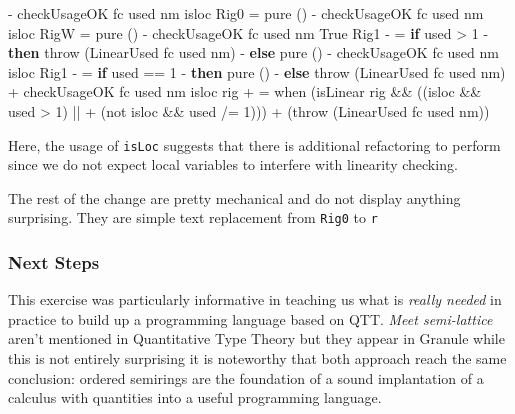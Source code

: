 \documentclass[
]{article}
\newenvironment{Shaded}{}{}
\newcommand{\DataTypeTok}[1]{\textcolor[rgb]{0.56,0.13,0.00}{#1}}
\newcommand{\DecValTok}[1]{\textcolor[rgb]{0.25,0.63,0.44}{#1}}
\newcommand{\FunctionTok}[1]{\textcolor[rgb]{0.02,0.16,0.49}{#1}}
\newcommand{\KeywordTok}[1]{\textcolor[rgb]{0.00,0.44,0.13}{\textbf{#1}}}
\newcommand{\NormalTok}[1]{#1}
\newcommand{\OperatorTok}[1]{\textcolor[rgb]{0.40,0.40,0.40}{#1}}
\newcommand{\OtherTok}[1]{\textcolor[rgb]{0.00,0.44,0.13}{#1}}
\begin{document}
\begin{Shaded}
\begin{Highlighting}[]
\OperatorTok{{-}}\NormalTok{       checkUsageOK fc used nm isloc }\DataTypeTok{Rig0} \OtherTok{=} \FunctionTok{pure}\NormalTok{ ()}
\OperatorTok{{-}}\NormalTok{       checkUsageOK fc used nm isloc }\DataTypeTok{RigW} \OtherTok{=} \FunctionTok{pure}\NormalTok{ ()}
\OperatorTok{{-}}\NormalTok{       checkUsageOK fc used nm }\DataTypeTok{True} \DataTypeTok{Rig1}
\OperatorTok{{-}}           \OtherTok{=} \KeywordTok{if}\NormalTok{ used }\OperatorTok{\textgreater{}} \DecValTok{1}
\OperatorTok{{-}}                \KeywordTok{then}\NormalTok{ throw (}\DataTypeTok{LinearUsed}\NormalTok{ fc used nm)}
\OperatorTok{{-}}                \KeywordTok{else} \FunctionTok{pure}\NormalTok{ ()}
\OperatorTok{{-}}\NormalTok{       checkUsageOK fc used nm isloc }\DataTypeTok{Rig1}
\OperatorTok{{-}}           \OtherTok{=} \KeywordTok{if}\NormalTok{ used }\OperatorTok{==} \DecValTok{1}
\OperatorTok{{-}}                \KeywordTok{then} \FunctionTok{pure}\NormalTok{ ()}
\OperatorTok{{-}}                \KeywordTok{else}\NormalTok{ throw (}\DataTypeTok{LinearUsed}\NormalTok{ fc used nm)}
\OperatorTok{+}\NormalTok{       checkUsageOK fc used nm isloc rig}
\OperatorTok{+}           \OtherTok{=}\NormalTok{ when (isLinear rig }\OperatorTok{\&\&}\NormalTok{ ((isloc }\OperatorTok{\&\&}\NormalTok{ used }\OperatorTok{\textgreater{}} \DecValTok{1}\NormalTok{) }\OperatorTok{||} 
\OperatorTok{+}\NormalTok{                                    (}\FunctionTok{not}\NormalTok{ isloc }\OperatorTok{\&\&}\NormalTok{ used }\OperatorTok{/=} \DecValTok{1}\NormalTok{)))}
\OperatorTok{+}\NormalTok{                  (throw (}\DataTypeTok{LinearUsed}\NormalTok{ fc used nm))}
\end{Highlighting}
\end{Shaded}

Here, the usage of \texttt{isLoc} suggests that there is additional
refactoring to perform since we do not expect local variables to
interfere with linearity checking.

The rest of the change are pretty mechanical and do not display anything
surprising. They are simple text replacement from \texttt{Rig0} to
\texttt{r}

\hypertarget{next-steps}{%
\subsubsection{Next Steps}\label{next-steps}}

This exercise was particularly informative in teaching us what is
\emph{really needed} in practice to build up a programming language
based on QTT. \emph{Meet semi-lattice} aren't mentioned in Quantitative
Type Theory\cite{qtt} but they appear in Granule \cite{granule} while
this is not entirely surprising it is noteworthy that both approach
reach the same conclusion: ordered semirings are the foundation of a
sound implantation of a calculus with quantities into a useful
programming language.
\end{document}
